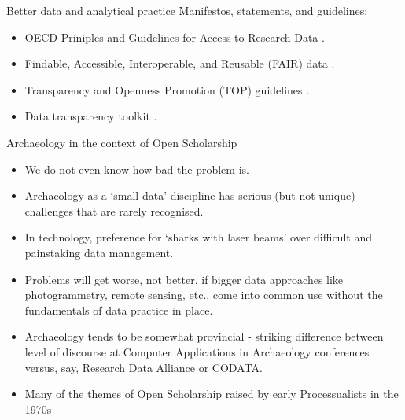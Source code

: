 \documentclass[aspectratio=169, 11pt]{beamer} %
\begin{document}
\begin{frame}{Better data and analytical practice}
  Manifestos, statements, and guidelines:
    \begin{itemize}[label=\textbullet]
        \item OECD Priniples and Guidelines for Access to Research Data \cite{Oecd2007-vi}.
        \item Findable, Accessible, Interoperable, and Reusable (FAIR) data \cite{Wilkinson2016-mr, Go-fair2017-vs}.
        \item Transparency and Openness Promotion (TOP) guidelines \cite{Nosek2015-wm, Cos2019-mr}.
        \item Data transparency toolkit \cite{Perkel2018-rw}.
    \end{itemize}
\end{frame}


\begin{frame}{Archaeology in the context of Open Scholarship}
    \begin{itemize}[label=\textbullet]
        \item We do not even know how bad the problem is.
        \item Archaeology as a `small data' discipline has serious (but not unique) challenges that are rarely recognised.
        \item In technology, preference for `sharks with laser beams' over difficult and painstaking data management. 
        \item Problems will get worse, not better, if bigger data approaches like photogrammetry, remote sensing, etc., come into common use without the fundamentals of data practice in place.
        \item Archaeology tends to be somewhat provincial - striking difference between level of discourse at Computer Applications in Archaeology conferences versus, say, Research Data Alliance or CODATA. 
        \item Many of the themes of Open Scholarship raised by early Processualists in the 1970s \cite{Hole1973-cy}  
    \end{itemize}
\end{frame}
\end{document}
